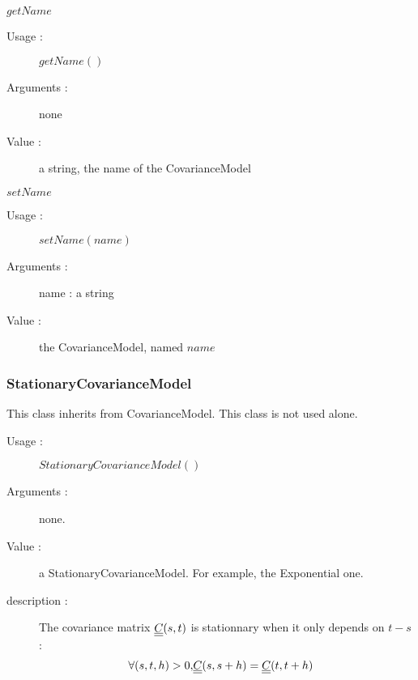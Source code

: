\begin{description}
\begin{description}
\begin{description}
    \end{description}
    \bigskip

  \item $getName$
    \begin{description}
    \item[Usage :] $getName()$
    \item[Arguments :] none
    \item[Value :] a string, the name of the CovarianceModel
    \end{description}
    \bigskip

  \item $setName$
    \begin{description}
    \item[Usage :] $setName(name)$
    \item[Arguments :] name : a string
    \item[Value :] the CovarianceModel, named $name$
    \end{description}
    \bigskip


  \end{description}

\end{description}


\newpage \subsubsection{StationaryCovarianceModel}

This class inherits from CovarianceModel. This class is not used alone.\\

\begin{description}

\item[Usage :] $StationaryCovarianceModel()$
  \bigskip

\item[Arguments :]  none.
  \bigskip

\item[Value :] a StationaryCovarianceModel. For example, the Exponential one. 
  \bigskip

\item[description :]  

The covariance matrix $ {\underline{\underline{C}}}(s,t)$ is stationnary when it only depends on $t-s$ : 
\begin{eqnarray}\label{covStat}
 \forall (s,t,h) >0,  &  {\underline{\underline{C}}}(s,s+h)  = {\underline{\underline{C}}}(t,t+h)
\end{eqnarray}
\end{description}





